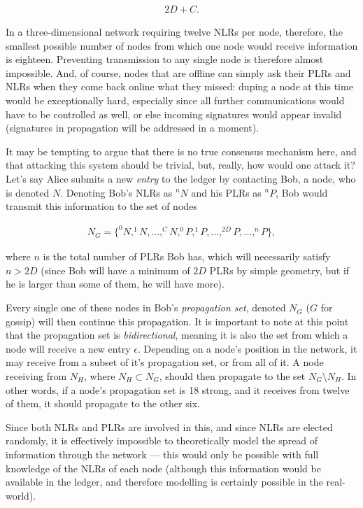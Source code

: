 \documentclass{extreport}
\begin{document}
\begin{align*}
2D + C. \tag{2.1}
\end{align*}

In a three-dimensional network requiring twelve NLRs per node, therefore, the smallest possible number of nodes from which one node would receive information is eighteen. Preventing transmission to any single node is therefore almost impossible. And, of course, nodes that are offline can simply ask their PLRs and NLRs when they come back online what they missed: duping a node at this time would be exceptionally hard, especially since all further communications would have to be controlled as well, or else incoming signatures would appear invalid (signatures in propagation will be addressed in a moment).

It may be tempting to argue that there is no true consensus mechanism here, and that attacking this system should be trivial, but, really, how would one attack it? Let's say Alice submits a new \emph{entry} to the ledger by contacting Bob, a node, who is denoted \(N\). Denoting Bob's NLRs as \(^nN\) and his PLRs as \(^nP\), Bob would transmit this information to the set of nodes

\begin{align*}
N_G = \{ ^0N, ^1N, ..., ^CN, ^0P, ^1P, ..., ^{2D}P, ..., ^nP \}, \tag{2.2}
\end{align*}

where \(n\) is the total number of PLRs Bob has, which will necessarily satisfy \(n > 2D\) (since Bob will have a minimum of \(2D\) PLRs by simple geometry, but if he is larger than some of them, he will have more).

Every single one of these nodes in Bob's \emph{propagation set}, denoted \(N_G\) (\(G\) for gossip) will then continue this propagation. It is important to note at this point that the propagation set is \emph{bidirectional}, meaning it is also the set from which a node will receive a new entry \(\epsilon\). Depending on a node's position in the network, it may receive from a subset of it's propagation set, or from all of it. A node receiving from \(N_H\), where \(N_H \subset N_G\), should then propagate to the set \(N_G \setminus N_H\). In other words, if a node's propagation set is 18 strong, and it receives from twelve of them, it should propagate to the other six.

Since both NLRs and PLRs are involved in this, and since NLRs are elected randomly, it is effectively impossible to theoretically model the spread of information through the network --- this would only be possible with full knowledge of the NLRs of each node (although this information would be available in the ledger, and therefore modelling is certainly possible in the real-world).
\end{document}
